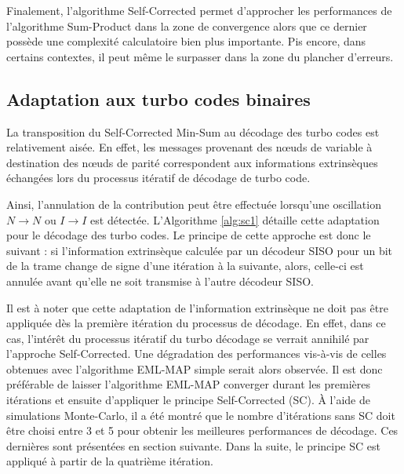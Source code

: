 Finalement, l'algorithme Self-Corrected permet d'approcher les performances de l'algorithme Sum-Product dans la zone de convergence alors
que ce dernier possède une complexité calculatoire bien plus importante. Pis encore, dans certains contextes, il peut même le 
surpasser dans la zone du plancher d'erreurs.

\subsection{Adaptation aux turbo codes binaires}
La transposition du Self-Corrected Min-Sum au décodage des turbo codes est relativement aisée. En effet, les messages provenant 
des nœuds de variable à destination des nœuds de parité correspondent aux informations extrinsèques échangées lors 
du processus itératif de décodage de turbo code.

Ainsi, l'annulation de la contribution peut être effectuée lorsqu'une oscillation $N \rightarrow N$ ou $I \rightarrow I$ est détectée.
L'Algorithme \ref{alg:sc1} détaille cette adaptation pour le décodage des turbo codes. Le principe de cette approche est 
donc le suivant : si l’information extrinsèque calculée par un décodeur SISO pour un bit de la trame change de 
signe d’une itération à la suivante, alors, celle-ci est annulée avant qu’elle ne soit transmise à l’autre 
décodeur SISO.

Il est à noter que cette adaptation de l'information extrinsèque ne doit pas être appliquée dès la première itération 
du processus de décodage. En effet, dans ce cas, l’intérêt du processus itératif du turbo décodage se verrait annihilé par l'approche Self-Corrected.
Une dégradation des performances vis-à-vis de celles obtenues avec l'algorithme EML-MAP simple serait alors observée.
Il est donc préférable de laisser l'algorithme EML-MAP converger durant les premières itérations et ensuite d'appliquer le principe 
Self-Corrected (SC). À l'aide de simulations Monte-Carlo, il a été montré que le nombre d'itérations sans SC doit être 
choisi entre 3 et 5 pour obtenir les meilleures performances de décodage. Ces dernières sont présentées en section suivante.
Dans la suite, le principe SC est appliqué à partir de la quatrième itération.

